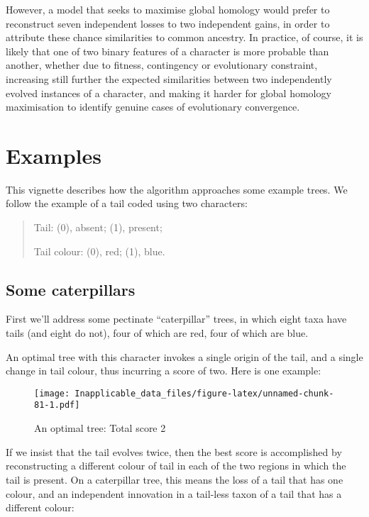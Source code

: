 \documentclass[]{book}
\theoremstyle{definition}
\theoremstyle{definition}
\theoremstyle{definition}
\theoremstyle{remark}
\begin{document}
However, a model that seeks to maximise global homology would prefer to
reconstruct seven independent losses to two independent gains, in order
to attribute these chance similarities to common ancestry. In practice,
of course, it is likely that one of two binary features of a character
is more probable than another, whether due to fitness, contingency or
evolutionary constraint, increasing still further the expected
similarities between two independently evolved instances of a character,
and making it harder for global homology maximisation to identify
genuine cases of evolutionary convergence.

\hypertarget{examples}{%
\chapter{Examples}\label{examples}}

This vignette describes how the algorithm approaches some example trees.
We follow the example of a tail coded using two characters:

\begin{quote}
Tail: (0), absent; (1), present;

Tail colour: (0), red; (1), blue.
\end{quote}

\hypertarget{some-caterpillars}{%
\section{Some caterpillars}\label{some-caterpillars}}

First we'll address some pectinate ``caterpillar'' trees, in which eight
taxa have tails (and eight do not), four of which are red, four of which
are blue.

An optimal tree with this character invokes a single origin of the tail,
and a single change in tail colour, thus incurring a score of two. Here
is one example:

\begin{figure}
\centering
\texttt{[image: Inapplicable\_data\_files/figure-latex/unnamed-chunk-81-1.pdf]}
\caption{\label{fig:unnamed-chunk-81}An optimal tree: Total score 2}
\end{figure}

If we insist that the tail evolves twice, then the best score is
accomplished by reconstructing a different colour of tail in each of the
two regions in which the tail is present. On a caterpillar tree, this
means the loss of a tail that has one colour, and an independent
innovation in a tail-less taxon of a tail that has a different colour:
\end{document}
